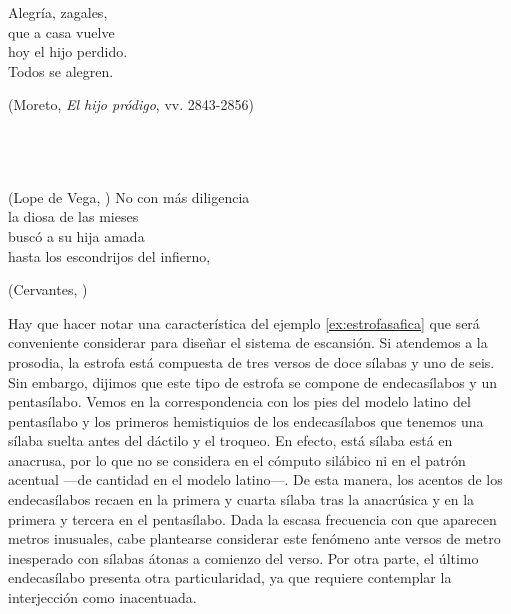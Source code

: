 \begin{exe}
	\ex\label{ex:seguidilla}Alegría, zagales,\\                                                                  
	que a casa vuelve\\
	hoy el hijo perdido.\\
	Todos se alegren.\\
	\strut\hfill(Moreto, \textit{El hijo pródigo}, vv. 2843-2856\nocite{moreto_hijoprodigo})
	\ex\label{ex:estrofasafica}\\	
\\
\\
\\
	\strut\hfill(Lope de Vega, )
	\ex\label{ex:endechareal}No con más diligencia\\
	la diosa de las mieses\\
	buscó a su hija amada\\
	hasta los escondrijos del infierno,\\
	\strut\hfill(Cervantes, )
\end{exe}

Hay que hacer notar una característica del ejemplo \ref{ex:estrofasafica} que será conveniente considerar para diseñar el sistema de escansión. Si atendemos a la prosodia, la estrofa está compuesta de tres versos de doce  sílabas y uno de seis. Sin embargo, dijimos que este tipo de estrofa se compone de endecasílabos y un pentasílabo. Vemos en la correspondencia con los pies del modelo latino del pentasílabo y los primeros hemistiquios de los endecasílabos que tenemos una sílaba suelta antes del dáctilo y el troqueo. En efecto, está sílaba está en anacrusa, por lo que no se considera en el cómputo silábico ni en el patrón acentual —de cantidad en el modelo latino—. De esta manera,  los acentos de los endecasílabos recaen en la primera y cuarta sílaba tras la anacrúsica y en la primera y tercera en el pentasílabo. Dada la escasa frecuencia con que aparecen metros inusuales, cabe plantearse considerar este fenómeno ante versos de metro inesperado con sílabas átonas a comienzo del verso. Por otra parte, el último endecasílabo presenta otra particularidad, ya que requiere contemplar la interjección como inacentuada.

